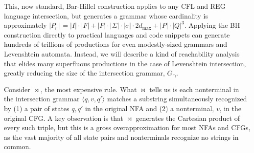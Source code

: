 \documentclass[sigplan,review,acmsmall,nonacm,anonymous]{acmart}\settopmatter{printfolios=false,printccs=false,printacmref=false}
\begin{document}
  \vspace{2pt}

  This, now standard, Bar-Hillel construction applies to any CFL and REG language intersection, but generates a grammar whose cardinality is approximately $|P_\cap|=|I|\cdot|F| + |P|\cdot|\Sigma|\cdot|\sigma|\cdot2d_{\max} + |P|\cdot|Q|^3$. Applying the BH construction directly to practical languages and code snippets can generate hundreds of trillions of productions for even modestly-sized grammars and Levenshtein automata. Instead, we will describe a kind of reachability analysis that elides many superfluous productions in the case of Levenshtein intersection, greatly reducing the size of the intersection grammar, $G_\cap$.


  Consider $\Join$, the most expensive rule. What $\Join$ tells us is each nonterminal in the intersection grammar $\langle q, v, q'\rangle$ matches a substring simultaneously recognized by (1) a pair of states $q, q'$ in the original NFA and (2) a nonterminal, $v$, in the original CFG. A key observation is that $\Join$ generates the Cartesian product of every such triple, but this is a gross overapproximation for most NFAs and CFGs, as the vast majority of all state pairs and nonterminals recognize no strings in common.
\end{document}

